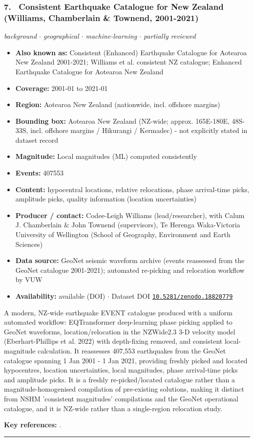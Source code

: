\documentclass[10pt,a4paper]{article}
\newcommand{\catentryrule}{\par\vspace{3pt}\noindent\textcolor{rulegrey}{\rule{\linewidth}{0.3pt}}\par\vspace{5pt}}
\newcommand{\kv}[2]{\item \textbf{#1:} #2}
\begin{document}
\subsubsection*{\hypertarget{c:7}{7.}~ Consistent Earthquake Catalogue for New Zealand (Williams, Chamberlain \& Townend, 2001-2021)}
{\small\itshape background $\cdot$ geographical $\cdot$ machine-learning $\cdot$ partially reviewed}\par\vspace{2pt}
\begin{itemize}[leftmargin=1.3em,itemsep=0.6pt,topsep=1pt,parsep=0pt]
\kv{Also known as}{Consistent (Enhanced) Earthquake Catalogue for Aotearoa New Zealand 2001-2021; Williams et al. consistent NZ catalogue; Enhanced Earthquake Catalogue for Aotearoa New Zealand}
\kv{Coverage}{2001-01 to 2021-01}
\kv{Region}{Aotearoa New Zealand (nationwide, incl. offshore margins)}
\kv{Bounding box}{Aotearoa New Zealand (NZ-wide; approx. 165E-180E, 48S-33S, incl. offshore margins / Hikurangi / Kermadec) - not explicitly stated in dataset record}
\kv{Magnitude}{Local magnitudes (ML) computed consistently}
\kv{Events}{407553}
\kv{Content}{hypocentral locations, relative relocations, phase arrival-time picks, amplitude picks, quality information (location uncertainties)}
\kv{Producer / contact}{Codee-Leigh Williams (lead/researcher), with Calum J. Chamberlain \& John Townend (supervisors), Te Herenga Waka-Victoria University of Wellington (School of Geography, Environment and Earth Sciences)}
\kv{Data source}{GeoNet seismic waveform archive (events reassessed from the GeoNet catalogue 2001-2021); automated re-picking and relocation workflow by VUW}
\kv{Availability}{available (DOI) $\cdot$ Dataset DOI \href{https://doi.org/10.5281/zenodo.18820779}{\nolinkurl{10.5281/zenodo.18820779}}}
\end{itemize}
\par\vspace{2pt}A modern, NZ-wide earthquake EVENT catalogue produced with a uniform automated workflow: EQTransformer deep-learning phase picking applied to GeoNet waveforms, location/relocation in the NZWide2.3 3-D velocity model (Eberhart-Phillips et al. 2022) with depth-fixing removed, and consistent local-magnitude calculation. It reassesses 407,553 earthquakes from the GeoNet catalogue spanning 1 Jan 2001 - 1 Jan 2021, providing freshly picked and located hypocentres, location uncertainties, local magnitudes, phase arrival-time picks and amplitude picks. It is a freshly re-picked/located catalogue rather than a magnitude-homogenised compilation of pre-existing solutions, making it distinct from NSHM 'consistent magnitudes' compilations and the GeoNet operational catalogue, and it is NZ-wide rather than a single-region relocation study.
\par\vspace{2pt}\textbf{Key references:} \cite{Williams2026,Williams2024,EberhartPhillips2022b}.
\catentryrule
\end{document}
